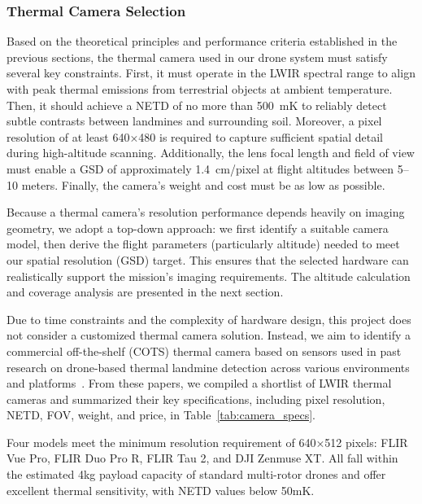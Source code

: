 \subsubsection{Thermal Camera Selection}

Based on the theoretical principles and performance criteria established in the previous sections, the thermal camera used in our drone system must satisfy several key constraints. First, it must operate in the LWIR spectral range to align with peak thermal emissions from terrestrial objects at ambient temperature. Then, it should achieve a NETD of no more than 500~mK to reliably detect subtle contrasts between landmines and surrounding soil. Moreover, a pixel resolution of at least 640×480 is required to capture sufficient spatial detail during high-altitude scanning. Additionally, the lens focal length and field of view must enable a GSD of approximately 1.4~cm/pixel at flight altitudes between 5–10 meters. Finally, the camera’s weight and cost must be as low as possible.

Because a thermal camera’s resolution performance depends heavily on imaging geometry, we adopt a top-down approach: we first identify a suitable camera model, then derive the flight parameters (particularly altitude) needed to meet our spatial resolution (GSD) target. This ensures that the selected hardware can realistically support the mission’s imaging requirements. The altitude calculation and coverage analysis are presented in the next section.

Due to time constraints and the complexity of hardware design, this project does not consider a customized thermal camera solution. Instead, we aim to identify a commercial off-the-shelf (COTS) thermal camera based on sensors used in past research on drone-based thermal landmine detection across various environments and platforms~\cite{baur2020applying,nikulin2018detection,krause2018diurnal,TENORIOTAMAYO2024105567,FORERORAMIREZ2022104307,rs15040967,dena2020image,Fardoulis2020PROOFHS,butt2024uav,AgrawalChung2024ComparingSL,Popov2022MethodFM,TENORIOTAMAYO2023109443}. From these papers, we compiled a shortlist of LWIR thermal cameras and summarized their key specifications, including pixel resolution, NETD, FOV, weight, and price, in Table~\ref{tab:camera_specs}.

Four models meet the minimum resolution requirement of 640×512 pixels: FLIR Vue Pro, FLIR Duo Pro R, FLIR Tau 2, and DJI Zenmuse XT. All fall within the estimated 4kg payload capacity of standard multi-rotor drones and offer excellent thermal sensitivity, with NETD values below 50mK.


